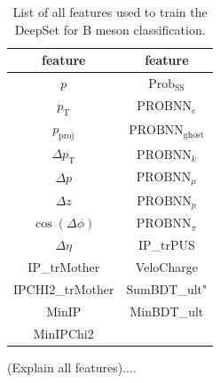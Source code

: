 \begin{table}
    \centering
    \caption{List of all features used to train the DeepSet for B meson classification.}
    \label{tab:B_features}
    \begin{tabular}{c c}
        \toprule
        feature & feature \\
        \midrule
        $p$                 & $\text{Prob}_\text{SS}$ \\ %
        $p_\text{T}$        & $\text{PROBNN}_e$ \\ %
        $p_\text{proj}$     & $\text{PROBNN}_\text{ghost}$ \\ %
        $\Delta p_\text{T}$ & $\text{PROBNN}_k$ \\ %
        $\Delta p$          & $\text{PROBNN}_\mu$ \\ %
        $\Delta z$          & $\text{PROBNN}_p$ \\ %
        $\cos(\Delta \phi)$ & $\text{PROBNN}_\pi$ \\ %
        $\Delta \eta$       & IP\_trPUS \\ %
        IP\_trMother        & VeloCharge \\ %
        IPCHI2\_trMother    & SumBDT\_ult" \\ %
        MinIP               & MinBDT\_ult \\ %
        MinIPChi2           & \\ %
        \bottomrule
    \end{tabular}
\end{table}

(Explain all features)....
